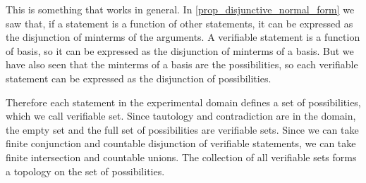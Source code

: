 \documentclass[11pt,letterpaper,fleqn]{memoir} %
\begin{document}
This is something that works in general. In \ref{prop_disjunctive_normal_form} we saw that, if a statement is a function of other statements, it can be expressed as the disjunction of minterms of the arguments. A verifiable statement is a function of basis, so it can be expressed as the disjunction of minterms of a basis. But we have also seen that the minterms of a basis are the possibilities, so each verifiable statement can be expressed as the disjunction of possibilities.


Therefore each statement in the experimental domain defines a set of possibilities, which we call verifiable set. Since tautology and contradiction are in the domain, the empty set and the full set of possibilities are verifiable sets. Since we can take finite conjunction and countable disjunction of verifiable statements, we can take finite intersection and countable unions. The collection of all verifiable sets forms a topology on the set of possibilities.
\end{document}
